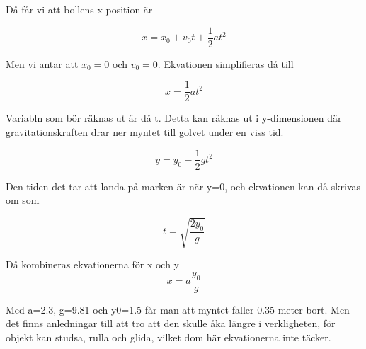 \documentclass[a4paper,12pt]{article}
\begin{document}
\begin{enumerate}
    Då får vi att bollens x-position är

    $$x=x_0+v_0t+\frac{1}{2}at^2$$

    Men vi antar att $x_0=0$ och $v_0=0$. 
    Ekvationen simplifieras då till

    $$x=\frac{1}{2}at^2$$
    
    Variabln som bör räknas ut är då t. Detta 
    kan räknas ut i y-dimensionen där gravitationskraften
    drar ner myntet till golvet under en viss tid.

    $$y=y_0-\frac{1}{2}gt^2$$
    
    Den tiden det tar att landa på marken är när y=0,
    och ekvationen kan då skrivas om som

    $$t=\sqrt{\frac{2y_0}{g}}$$ 

    Då kombineras ekvationerna för x och y
    $$x=a\frac{y_0}{g}$$

    Med a=2.3, g=9.81 och y0=1.5 får man att 
    myntet faller 0.35 meter bort. Men det finns anledningar
    till att tro att den skulle åka längre i verkligheten, för
    objekt kan studsa, rulla och glida, vilket dom här 
    ekvationerna inte täcker. 

\end{enumerate}
\end{document}
